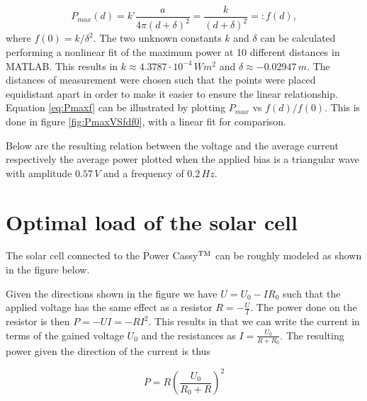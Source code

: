 \documentclass[a4paper,twoside=false,abstract=false,numbers=noenddot,
titlepage=false,headings=small,parskip=half,version=last]{scrartcl}
\begin{document}
\begin{equation}
    P_{max}(d) = k’\frac{a}{4\pi(d+\delta)^2} = \frac{k}{(d+\delta)^2} =: f(d),\label{eq:Pmaxf}
\end{equation}
where $f(0) = k/\delta^2$.
The two unknown constants $k$ and $\delta$ can be calculated performing a
nonlinear fit of the maximum power at 10 different distances in MATLAB. This
results in $k \approx 4.3787\cdot 10^{-4}\,Wm^{2}$ and $\delta \approx -0.02947\,m$.
The distances of measurement were chosen such that the points were placed equidistant apart
in order to make it easier to ensure the linear relationship.
Equation \eqref{eq:Pmaxf} can be illustrated by plotting $P_{max}$ vs $f(d)/f(0)$.
This is done in figure \ref{fig:PmaxVSfdf0}, with a linear fit for comparison.


Below are the resulting relation between the voltage and the average current
respectively the average power plotted when the applied bias is a triangular
wave with amplitude $0.57\,V$ and a frequency of $0.2\,Hz$.




\section{Optimal load of the solar cell}
The solar cell connected to the Power Cassy$\textsuperscript{TM}$ can be roughly modeled as shown in the figure below.


Given the directions shown in the figure we have $U=U_0-IR_0$ such that the
applied voltage has the same effect as a resistor $R=-\frac{U}{I}$.
The power done on the resistor is then $P=-U I=-R I^{2}$.
This results in that we can write the current in terms of the gained voltage $U_0$ and the resistances as $I=\frac{U_0}{R + R_0}$.
The resulting power given the direction of the current is thus

\begin{equation}
    P = R (\frac{ U_0}{ R_0+R})^{2}
\end{equation}
\end{document}
